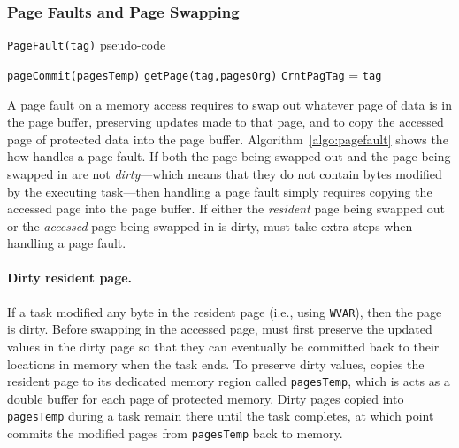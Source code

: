 \subsubsection{Page Faults and Page Swapping}

\begin{algorithm}[t]
	\caption{\texttt{PageFault(tag)} pseudo-code}
	\label{algo:pagefault}
	\scriptsize
	\begin{algorithmic}[1]
			
		\State \texttt{pageCommit(pagesTemp)} 
		\EndIf
		 
		 
		\Else
		\State \texttt{getPage(tag,pagesOrg)} 
		\EndIf 
		\State \texttt{CrntPagTag} = \texttt{tag} 
	\end{algorithmic}
\end{algorithm}

A page fault on a memory access requires \sys to swap out whatever page of data is in the page buffer, preserving updates made to that page, and to copy the accessed page of protected data into the page buffer. Algorithm~\ref{algo:pagefault} shows the how \sys handles a page fault. If both the page being swapped out and the page being swapped in are not {\em dirty}---which means that they do not contain bytes modified by the executing task---then handling a page fault simply requires copying the accessed page into the page buffer. If either the {\em resident} page being swapped out or the {\em accessed} page being swapped in is dirty, \sys must take extra steps when handling a page fault. 

\paragraph{Dirty resident page.} If a task modified any byte in the resident page (i.e.,  using \texttt{WVAR}), then the page is dirty. Before swapping in the accessed page, \sys must first preserve the updated values in the dirty page so that they can eventually be committed back to their locations in memory when the task ends. To preserve dirty values, \sys copies the resident page to its dedicated memory region called \texttt{pagesTemp}, which is acts as a double buffer for each page of protected memory. Dirty pages copied into {\tt pagesTemp} during a task remain there until the task completes, at which point \sys commits the modified pages from {\tt pagesTemp} back to memory.  


